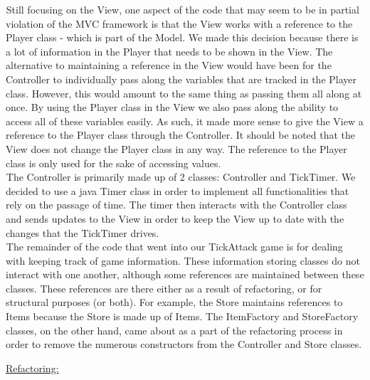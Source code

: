 \documentclass[letter paper, 12pt]{article}
\newcommand{\tab}{${}_{}$\hspace{0.2in}}
\newcommand{\noin}{\noindent}
\begin{document}
\tab Still focusing on the View, one aspect of the code that may seem to be in partial violation of the MVC framework is that the View works with a reference to the Player class - which is part of the Model. We made this decision because there is a lot of information in the Player that needs to be shown in the View. The alternative to maintaining a reference in the View would have been for the Controller to individually pass along the variables that are tracked in the Player class. However, this would amount to the same thing as passing them all along at once. By using the Player class in the View we also pass along the ability to access all of these variables easily. As such, it made more sense to give the View a reference to the Player class through the Controller. It should be noted that the View does not change the Player class in any way. The reference to the Player class is only used for the sake of accessing values.\\
\tab The Controller is primarily made up of 2 classes: Controller and TickTimer. We decided to use a java Timer class in order to implement all functionalities that rely on the passage of time. The timer then interacts with the Controller class and sends updates to the View in order to keep the View up to date with the changes that the TickTimer drives.\\
\tab The remainder of the code that went into our TickAttack game is for dealing with keeping track of game information. These information storing classes do not interact with one another, although some references are maintained between these classes. These references are there either as a result of refactoring, or for structural purposes (or both). For example, the Store maintains references to Items because the Store is made up of Items. The ItemFactory and StoreFactory classes, on the other hand, came about as a part of the refactoring process in order to remove the numerous constructors from the Controller and Store classes.\bigskip 

\noin\underline{Refactoring:}\vspace{5pt}
\end{document}
